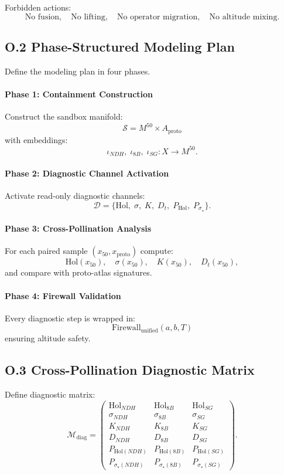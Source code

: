 Forbidden actions:
\[
\text{No fusion},\quad \text{No lifting},\quad
\text{No operator migration},\quad
\text{No altitude mixing}.
\]

\subsection*{O.2 Phase-Structured Modeling Plan}

Define the modeling plan in four phases.

\paragraph{Phase 1: Containment Construction}
Construct the sandbox manifold:
\[
\mathcal{S} = M^{50} \times A_{\mathrm{proto}}
\]
with embeddings:
\[
\iota_{NDH},\; \iota_{8B},\; \iota_{SG} : X \to M^{50}.
\]

\paragraph{Phase 2: Diagnostic Channel Activation}
Activate read-only diagnostic channels:
\[
\mathcal{D} =
\{ \mathrm{Hol},\; \sigma,\; K,\; D_t,\; P_{\mathrm{Hol}},\;
P_{\sigma_{\star}} \}.
\]

\paragraph{Phase 3: Cross-Pollination Analysis}
For each paired sample $(x_{50}, x_{\mathrm{proto}})$ compute:
\[
\mathrm{Hol}(x_{50}),\quad
\sigma(x_{50}),\quad
K(x_{50}),\quad
D_t(x_{50}),
\]
and compare with proto-atlas signatures.

\paragraph{Phase 4: Firewall Validation}
Every diagnostic step is wrapped in:
\[
\mathrm{Firewall}_{\mathrm{unified}}(a,b,T)
\]
ensuring altitude safety.

\subsection*{O.3 Cross-Pollination Diagnostic Matrix}

Define diagnostic matrix:
\[
\mathcal{M}_{\mathrm{diag}} =
\begin{pmatrix}
\mathrm{Hol}_{NDH} & \mathrm{Hol}_{8B} & \mathrm{Hol}_{SG} \\
\sigma_{NDH} & \sigma_{8B} & \sigma_{SG} \\
K_{NDH} & K_{8B} & K_{SG} \\
D_{NDH} & D_{8B} & D_{SG} \\
P_{\mathrm{Hol}(NDH)} & P_{\mathrm{Hol}(8B)} & P_{\mathrm{Hol}(SG)} \\
P_{\sigma_{\star}(NDH)} & P_{\sigma_{\star}(8B)} & P_{\sigma_{\star}(SG)}
\end{pmatrix}.
\]

